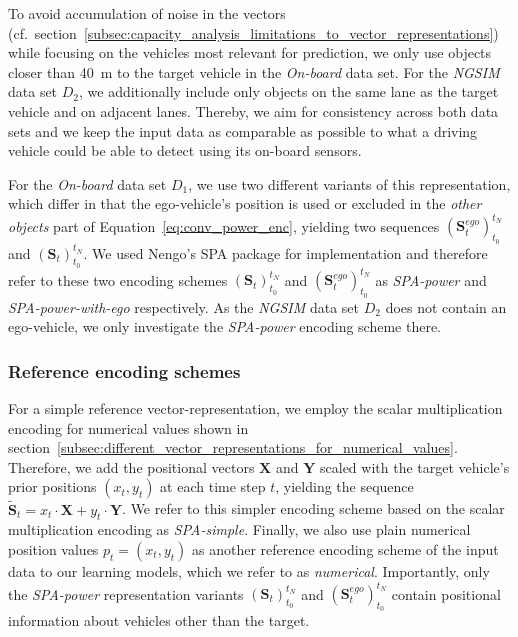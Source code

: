 To avoid accumulation of noise in the vectors (cf.\ section~\ref{subsec:capacity_analysis_limitations_to_vector_representations}) while focusing on the vehicles most relevant for prediction, we only use objects closer than \SI{40}{\meter} to the target vehicle in the \emph{On-board} data set.
For the \emph{\ac{NGSIM}} data set $D_2$, we additionally include only objects on the same lane as the target vehicle and on adjacent lanes.
Thereby, we aim for consistency across both data sets and we keep the input data as comparable as possible to what a driving vehicle could be able to detect using its on-board sensors.

For the \emph{On-board} data set $D_1$, we use two different variants of this representation, which differ in that the ego-vehicle's position is used or excluded in the \emph{other objects} part of Equation~\eqref{eq:conv_power_enc}, yielding two sequences $(\mathbf{S}_{t}^{ego})_{t_0}^{t_N}$ and $(\mathbf{S}_{t})_{t_0}^{t_N}$.
We used \acs{Nengo}'s \ac{SPA} package for implementation and therefore refer to these two encoding schemes $(\mathbf{S}_{t})_{t_0}^{t_N}$ and $(\mathbf{S}_{t}^{ego})_{t_0}^{t_N}$ as \emph{\ac{SPA}-power} and \emph{\ac{SPA}-power-with-ego} respectively.
As the \emph{\ac{NGSIM}} data set $D_2$ does not contain an ego-vehicle, we only investigate the \emph{\ac{SPA}-power} encoding scheme there.

\subsubsection{Reference encoding schemes}%
\label{ssubsec:reference_encoding_schemes}

For a simple reference vector-representation, we employ the scalar multiplication encoding for numerical values shown in section~\ref{subsec:different_vector_representations_for_numerical_values}.
Therefore, we add the positional vectors $\mathbf{X}$ and $\mathbf{Y}$ scaled with the target vehicle's prior positions $(x_{t}, y_{t})$ at each time step $t$, yielding the sequence $\tilde{\mathbf{S}}_{t} =  x_{t} \cdot \mathbf{X} + y_{t}\cdot \mathbf{Y}$.
We refer to this simpler encoding scheme based on the scalar multiplication encoding as \emph{\ac{SPA}-simple}.
Finally, we also use plain numerical position values $p_t = (x_{t}, y_{t})$ as another reference encoding scheme of the input data to our learning models, which we refer to as \emph{numerical}.
Importantly, only the \emph{\ac{SPA}-power} representation variants $(\mathbf{S}_{t})_{t_0}^{t_N}$ and $(\mathbf{S}_{t}^{ego})_{t_0}^{t_N}$ contain positional information about vehicles other than the target.

